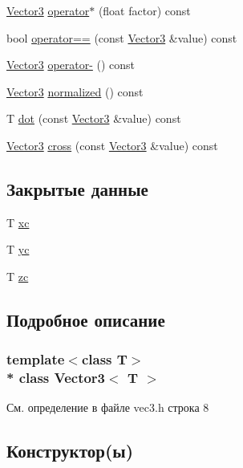 \begin{DoxyCompactItemize}
\item 
\hyperlink{class_vector3}{Vector3} \hyperlink{class_vector3_af20828ee3001ba69624cce6ff7153afa}{operator$\ast$} (float factor) const 
\item 
bool \hyperlink{class_vector3_ade37f1281bae4dab3cfedab423319912}{operator==} (const \hyperlink{class_vector3}{Vector3} \&value) const 
\item 
\hyperlink{class_vector3}{Vector3} \hyperlink{class_vector3_a18f31710eb03fb10ea8eafd2e8834974}{operator-\/} () const 
\item 
\hyperlink{class_vector3}{Vector3} \hyperlink{class_vector3_add47d32a13094de4ff7215296aec0bc6}{normalized} () const 
\item 
T \hyperlink{class_vector3_adee56adcf1000649a1fcf2265e8b12b5}{dot} (const \hyperlink{class_vector3}{Vector3} \&value) const 
\item 
\hyperlink{class_vector3}{Vector3} \hyperlink{class_vector3_ab58658d09f875a7fcc2ca98a8112af84}{cross} (const \hyperlink{class_vector3}{Vector3} \&value) const 
\end{DoxyCompactItemize}
\subsection*{Закрытые данные}
\begin{DoxyCompactItemize}
\item 
T \hyperlink{class_vector3_a7f85df8589147274b76ccea757bc3868}{xc}
\item 
T \hyperlink{class_vector3_a0b0084b4c366805a4cf48558fc21c4a8}{yc}
\item 
T \hyperlink{class_vector3_a5ba4eecf62db2872046d9e3fe01fb406}{zc}
\end{DoxyCompactItemize}


\subsection{Подробное описание}
\subsubsection*{template$<$class T$>$\\*
class Vector3$<$ T $>$}



См. определение в файле vec3.\+h строка 8



\subsection{Конструктор(ы)}

